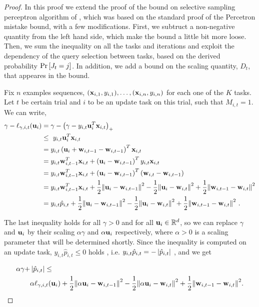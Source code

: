 {\begin{proof}
In this proof we extend the proof of the bound on selective sampling perceptron algorithm  of 
\cite{DBLP:journals/jmlr/Cesa-BianchiGZ06a}, which was based on the standard proof 
of the Percetron mistake bound, with a few modifications. First, we subtruct a 
non-negative quantity from the left hand side, which make the bound a little bit 
more loose. Then, we sum the inequality on all the tasks and iterations and exploit the dependency of 
the query selection between tasks, based on the derived probability ${\rm Pr}\left[{J_t=j}\right] $. In addition, 
we add a bound on the scaling quantity, $D_t$, that appeares in the bound.

Fix $n$ examples sequences, $(\mathbf{x}_{i,1},y_{i,1}),\ldots,(\mathbf{x}_{i,n},y_{i,n})$ for each one of the $K$ tasks. 
Let $t$ be certain trial and $i$ to be an update task on this trial, such that $M_{i,t}=1$. 
We can write,
\begin{align*}
\gamma-\ell_{\gamma,i,t}(\mathbf{u}_i)&=\gamma-\left({\gamma-y_{i,t}\mathbf{u}_i^T\mathbf{x}_{i,t}}\right)_+\\
 ~&\le~  y_{i,t}\mathbf{u}_i^{T}\mathbf{x}_{i,t} \\
&= y_{i,t}\left({\mathbf{u}_i+\mathbf{w}_{i,t-1}-\mathbf{w}_{i,t-1}}\right)^{T}\mathbf{x}_{i,t}\\
&= y_{i,t}\mathbf{w}_{i,t-1}^{T}\mathbf{x}_{i,t}+\left({\mathbf{u}_i-\mathbf{w}_{i,t-1}}\right)^{T}y_{i,t}\mathbf{x}_{i,t}\\
&= y_{i,t}\mathbf{w}_{i,t-1}^{T}\mathbf{x}_{i,t}+\left({\mathbf{u}_i-\mathbf{w}_{i,t-1}}\right)^{T}\left({\mathbf{w}_{i,t}-\mathbf{w}_{i,t-1}}\right)\\
&=  y_{i,t}\mathbf{w}_{i,t-1}^{T}\mathbf{x}_{i,t}+\frac{1}{2}{\left\Vert {\mathbf{u}_{i}-\mathbf{w}_{i,t-1}} \right\Vert^2}
        -\frac{1}{2}{\left\Vert {\mathbf{u}_i-\mathbf{w}_{i,t}} \right\Vert^2}+\frac{1}{2}{\left\Vert {\mathbf{w}_{i,t-1}-\mathbf{w}_{i,t}} \right\Vert^2}\\
&=  y_{i,t}\hat{p}_{i,t}+\frac{1}{2}{\left\Vert {\mathbf{u}_{i}-\mathbf{w}_{i,t-1}} \right\Vert^2}
        -\frac{1}{2}{\left\Vert {\mathbf{u}_i-\mathbf{w}_{i,t}} \right\Vert^2}+\frac{1}{2}{\left\Vert {\mathbf{w}_{i,t-1}-\mathbf{w}_{i,t}} \right\Vert^2}~.
\end{align*}

\noindent
The last inequality holds for all $\gamma>0$ and for all
$\mathbf{u}_i\in\mathbb{R}^d$, so we can replace $\gamma$ and $\mathbf{u}_i$ by their
scaling $\alpha\gamma$ and $\alpha \mathbf{u}_i$ respectively, where $\alpha>0$
is a scaling parameter that will be determined shortly. Since the inequality is computed on an update task,
$y_{i,t}\hat{p}_{i,t}\le0$ holds , i.e. $y_{i,t}\hat{p}_{i,t}=-\left\vert{\hat{p}_{i,t}}\right\vert$ , and we get

\begin{equation}
\begin{split}
\alpha\gamma  +&\left\vert{\hat{p}_{i,t}}\right\vert \le\\
&\alpha\ell_{\gamma,i,t}(\mathbf{u}_i)+\frac{1}{2}{\left\Vert {\alpha \mathbf{u}_i-\mathbf{w}_{i,t-1}} \right\Vert^2}-\frac{1}{2}{\left\Vert {\alpha \mathbf{u}_i-\mathbf{w}_{i,t}} \right\Vert^2}+\frac{1}{2}{\left\Vert {\mathbf{w}_{i,t-1}-\mathbf{w}_{i,t}} \right\Vert^2} .\end{split}
\label{eq:FO_introducing_alpha}
\end{equation}


\end{proof}}
